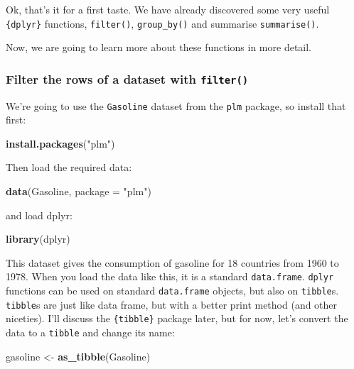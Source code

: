 \documentclass[
]{article}
\newenvironment{Shaded}{\begin{snugshade}}{\end{snugshade}}
\newcommand{\DataTypeTok}[1]{\textcolor[rgb]{0.13,0.29,0.53}{#1}}
\newcommand{\KeywordTok}[1]{\textcolor[rgb]{0.13,0.29,0.53}{\textbf{#1}}}
\newcommand{\NormalTok}[1]{#1}
\newcommand{\StringTok}[1]{\textcolor[rgb]{0.31,0.60,0.02}{#1}}
\begin{document}
Ok, that's it for a first taste. We have already discovered some very useful \texttt{\{dplyr\}} functions,
\texttt{filter()}, \texttt{group\_by()} and summarise \texttt{summarise()}.

Now, we are going to learn more about these functions in more detail.

\hypertarget{filter-the-rows-of-a-dataset-with-filter}{%
\subsubsection{\texorpdfstring{Filter the rows of a dataset with \texttt{filter()}}{Filter the rows of a dataset with filter()}}\label{filter-the-rows-of-a-dataset-with-filter}}

We're going to use the \texttt{Gasoline} dataset from the \texttt{plm} package, so install that first:

\begin{Shaded}
\begin{Highlighting}[]
\KeywordTok{install.packages}\NormalTok{(}\StringTok{"plm"}\NormalTok{)}
\end{Highlighting}
\end{Shaded}

Then load the required data:

\begin{Shaded}
\begin{Highlighting}[]
\KeywordTok{data}\NormalTok{(Gasoline, }\DataTypeTok{package =} \StringTok{"plm"}\NormalTok{)}
\end{Highlighting}
\end{Shaded}

and load dplyr:

\begin{Shaded}
\begin{Highlighting}[]
\KeywordTok{library}\NormalTok{(dplyr)}
\end{Highlighting}
\end{Shaded}

This dataset gives the consumption of gasoline for 18 countries from 1960 to 1978. When you load
the data like this, it is a standard \texttt{data.frame}. \texttt{dplyr} functions can be used on standard
\texttt{data.frame} objects, but also on \texttt{tibble}s. \texttt{tibble}s are just like data frame, but with a better
print method (and other niceties). I'll discuss the \texttt{\{tibble\}} package later, but for now, let's
convert the data to a \texttt{tibble} and change its name:

\begin{Shaded}
\begin{Highlighting}[]
\NormalTok{gasoline \textless{}{-}}\StringTok{ }\KeywordTok{as\_tibble}\NormalTok{(Gasoline)}
\end{Highlighting}
\end{Shaded}
\end{document}

